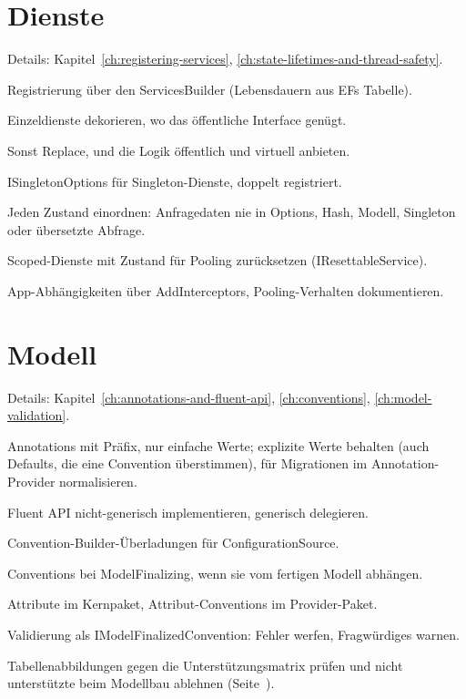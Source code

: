 \section{Dienste}

\noindent Details: Kapitel~\ref{ch:registering-services}, \ref{ch:state-lifetimes-and-thread-safety}.

\begin{checklist}
  \item Registrierung über den ServicesBuilder (Lebensdauern aus EFs Tabelle).
  \item Einzeldienste dekorieren, wo das öffentliche Interface genügt.
  \item Sonst Replace, und die Logik öffentlich und virtuell anbieten.
  \item ISingletonOptions für Singleton-Dienste, doppelt registriert.
  \item Jeden Zustand einordnen: Anfragedaten nie in
    Options, Hash, Modell, Singleton oder übersetzte Abfrage.
  \item Scoped-Dienste mit Zustand für Pooling zurücksetzen (IResettableService).
  \item App-Abhängigkeiten über AddInterceptors, Pooling-Verhalten dokumentieren.
\end{checklist}

\section{Modell}

\noindent Details: Kapitel~\ref{ch:annotations-and-fluent-api}, \ref{ch:conventions}, \ref{ch:model-validation}.

\begin{checklist}
  \item Annotations mit Präfix, nur einfache Werte; explizite Werte behalten (auch Defaults, die
    eine Convention überstimmen), für Migrationen im Annotation-Provider normalisieren.
  \item Fluent API nicht-generisch implementieren, generisch delegieren.
  \item Convention-Builder-Überladungen für ConfigurationSource.
  \item Conventions bei ModelFinalizing, wenn sie vom fertigen Modell abhängen.
  \item Attribute im Kernpaket, Attribut-Conventions im Provider-Paket.
  \item Validierung als IModelFinalizedConvention: Fehler werfen, Fragwürdiges warnen.
  \item Tabellenabbildungen gegen die Unterstützungsmatrix prüfen und nicht unterstützte beim
    Modellbau ablehnen (Seite~\pageref{sec:supported-table-mappings}).
\end{checklist}

